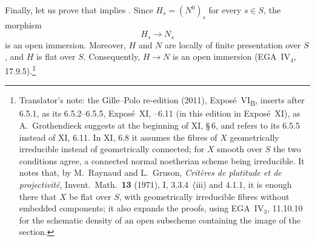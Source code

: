 Finally, let us prove that \textup{} implies \textup{}.
Since \(H_s=(N^0)_s\) for every \(s\in S\), the morphism
\[
  H_s\longrightarrow N_s
\]
is an open immersion. Moreover, \(H\) and \(N\) are locally of
finite presentation over \(S\), and \(H\) is flat over \(S\).
Consequently, \(H\to N\) is an open immersion
(EGA~IV\(_4\), 17.9.5).\footnote{Translator's note: the Gille--Polo re-edition (2011), Expos\'e~VI\textsubscript{B},
inserts after 6.5.1, as its 6.5.2--6.5.5, Expos\'e~XI, --6.11 (in this
edition in Expos\'e~XI), as A.~Grothendieck suggests at the beginning of XI, \S\,6, and refers to its 6.5.5
instead of XI, 6.11. In XI, 6.8 it assumes the fibres of \(X\) geometrically irreducible instead of geometrically
connected; for \(X\) smooth over \(S\) the two conditions agree, a connected normal noetherian scheme being
irreducible. It notes that, by M.~Raynaud and L.~Gruson, \emph{Crit\`eres de platitude et de projectivit\'e},
Invent.\ Math.\ \textbf{13} (1971), I, 3.3.4~(iii) and 4.1.1, it is enough there that \(X\) be flat over \(S\),
with geometrically irreducible fibres without embedded components; it also expands the proofs, using
EGA~IV\(_3\), 11.10.10 for the schematic density of an open subscheme containing the image of the section.}

